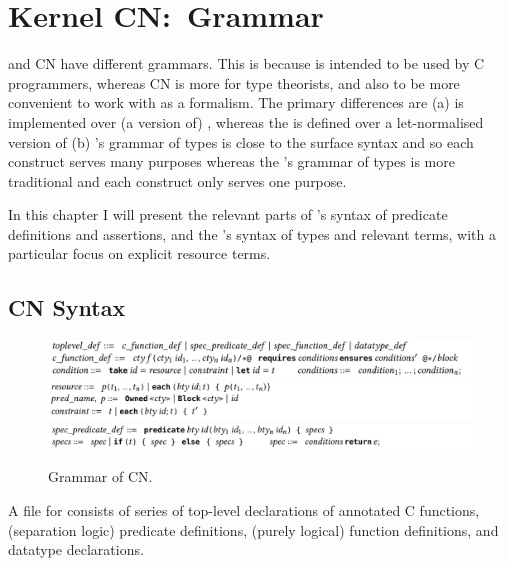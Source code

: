 \chapter{Kernel CN:\ Grammar}%
\label{chap:kernel-grammar}

 and  CN have different grammars. This is because  is
intended to be used by C programmers, whereas  CN is more for type
theorists, and also to be more convenient to work with as a formalism. The
primary differences are (a)  is implemented over (a version of)
, whereas the  is defined over a let-normalised version of
 (b) 's grammar of types is close to the surface syntax and so
each construct serves many purposes whereas the 's grammar of types
is more traditional and each construct only serves one purpose.

In this chapter I will present the relevant parts of 's syntax of
predicate definitions and assertions, and the 's syntax of types and
relevant terms, with a particular focus on explicit resource terms.

\section{CN Syntax}%

\begin{figure}[tp]
    \centering
    \includegraphics{figures/cn-grammar-1}
    \includegraphics{figures/cn-grammar-2}
    \includegraphics{figures/cn-grammar-3}
    \caption{Grammar of CN.}\label{fig:cn-grammar}
\end{figure}

A file for  consists of series of top-level declarations of annotated C
functions, (separation logic) predicate definitions, (purely logical) function
definitions, and datatype declarations. 

